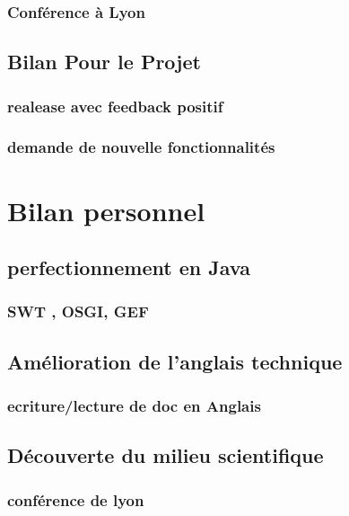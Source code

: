 \documentclass{article}
\begin{document}
        \subsubsection{Conférence à Lyon}
    \subsection{Bilan Pour le Projet}
        \subsubsection{realease avec feedback positif}
        \subsubsection{demande de nouvelle fonctionnalités}
        
\section{Bilan personnel}
    \subsection{perfectionnement en Java}
        \subsubsection{SWT , OSGI, GEF}
    \subsection{Amélioration de l'anglais technique}
        \subsubsection{ecriture/lecture de doc en Anglais}
    \subsection{Découverte du milieu scientifique}
        \subsubsection{conférence de lyon}
    
\end{document}
